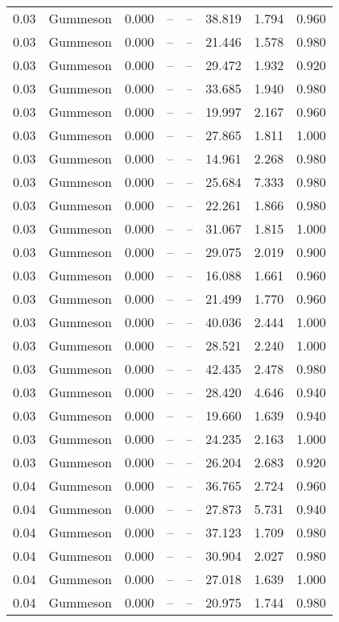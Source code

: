 \begin{table}[H]
\begin{tabular}{l c l l l}
0.03 & Gummeson & 0.000 & -- & -- & 38.819 & 1.794 & 0.960 \\
0.03 & Gummeson & 0.000 & -- & -- & 21.446 & 1.578 & 0.980 \\
0.03 & Gummeson & 0.000 & -- & -- & 29.472 & 1.932 & 0.920 \\
0.03 & Gummeson & 0.000 & -- & -- & 33.685 & 1.940 & 0.980 \\
0.03 & Gummeson & 0.000 & -- & -- & 19.997 & 2.167 & 0.960 \\
0.03 & Gummeson & 0.000 & -- & -- & 27.865 & 1.811 & 1.000 \\
0.03 & Gummeson & 0.000 & -- & -- & 14.961 & 2.268 & 0.980 \\
0.03 & Gummeson & 0.000 & -- & -- & 25.684 & 7.333 & 0.980 \\
0.03 & Gummeson & 0.000 & -- & -- & 22.261 & 1.866 & 0.980 \\
0.03 & Gummeson & 0.000 & -- & -- & 31.067 & 1.815 & 1.000 \\
0.03 & Gummeson & 0.000 & -- & -- & 29.075 & 2.019 & 0.900 \\
0.03 & Gummeson & 0.000 & -- & -- & 16.088 & 1.661 & 0.960 \\
0.03 & Gummeson & 0.000 & -- & -- & 21.499 & 1.770 & 0.960 \\
0.03 & Gummeson & 0.000 & -- & -- & 40.036 & 2.444 & 1.000 \\
0.03 & Gummeson & 0.000 & -- & -- & 28.521 & 2.240 & 1.000 \\
0.03 & Gummeson & 0.000 & -- & -- & 42.435 & 2.478 & 0.980 \\
0.03 & Gummeson & 0.000 & -- & -- & 28.420 & 4.646 & 0.940 \\
0.03 & Gummeson & 0.000 & -- & -- & 19.660 & 1.639 & 0.940 \\
0.03 & Gummeson & 0.000 & -- & -- & 24.235 & 2.163 & 1.000 \\
0.03 & Gummeson & 0.000 & -- & -- & 26.204 & 2.683 & 0.920 \\
0.04 & Gummeson & 0.000 & -- & -- & 36.765 & 2.724 & 0.960 \\
0.04 & Gummeson & 0.000 & -- & -- & 27.873 & 5.731 & 0.940 \\
0.04 & Gummeson & 0.000 & -- & -- & 37.123 & 1.709 & 0.980 \\
0.04 & Gummeson & 0.000 & -- & -- & 30.904 & 2.027 & 0.980 \\
0.04 & Gummeson & 0.000 & -- & -- & 27.018 & 1.639 & 1.000 \\
0.04 & Gummeson & 0.000 & -- & -- & 20.975 & 1.744 & 0.980 \\

\end{tabular}
\end{table}
